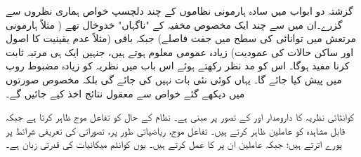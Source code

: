 
گزشتہ دو ابواب میں سادہ ہارمونی نظاموں کے چند دلچسپ خواص ہماری نظروں سے گزرے۔ان میں سے چند ایک مخصوص مخفیہ کے  "ناگہاں" خدوخال تھے ( مثلاً ہارمونی مرتعش میں توانائی کی سطح میں جفت فاصلے) جبکہ باقی (مثلاً عدم یقینیت کا اصول اور ساکن حالات کی عمودیت) زیادہ عمومی معلوم ہوتے ہیں، جنہیں ایک ہی مرتبہ ثابت کرنا مفید  ہوگا۔ اس کو مد نظر رکھتے ہوئے اس باب میں نظریہ کو زیادہ مضبوط روپ میں پیش کیا جائے گا۔ یہاں کوئی نئی بات نہیں کی جائے گی بلکہ مخصوص صورتوں میں دیکھے گئے خواص سے معقول نتائج اخذ کیے جائیں گے۔
	
کوانٹائی نظریہ کا دارومدار اور  کے تصور پر مبنی ہے۔ نظام کے حال کو تفاعل موج ظاہر کرتا ہے جبکہ قابل مشاہدہ کو عاملین ظاہر کرتے ہیں۔ تفاعل موج،  ریاضیاتی طور پر،  تصوراتی  کی تعریفی شرائط پر پورے اترتے ہیں؛  جبکہ عاملین ان پر  کا عمل کرتے ہیں۔ یوں کوانٹم میکانیات کی قدرتی زبان  ہے۔
	
